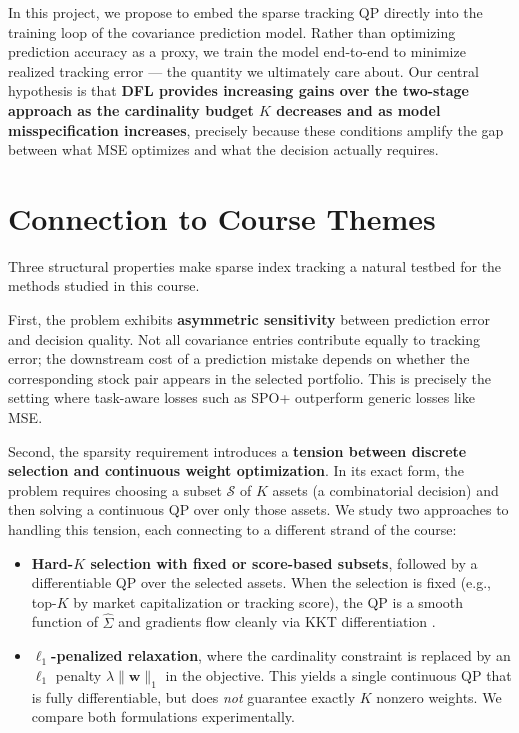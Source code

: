 \documentclass[11pt]{article}
\begin{document}
In this project, we propose to embed the sparse tracking QP directly into the training loop of the covariance prediction model. Rather than optimizing prediction accuracy as a proxy, we train the model end-to-end to minimize realized tracking error --- the quantity we ultimately care about. Our central hypothesis is that \textbf{DFL provides increasing gains over the two-stage approach as the cardinality budget $K$ decreases and as model misspecification increases}, precisely because these conditions amplify the gap between what MSE optimizes and what the decision actually requires.

\section{Connection to Course Themes}

Three structural properties make sparse index tracking a natural testbed for the methods studied in this course.

First, the problem exhibits \textbf{asymmetric sensitivity} between prediction error and decision quality. Not all covariance entries contribute equally to tracking error; the downstream cost of a prediction mistake depends on whether the corresponding stock pair appears in the selected portfolio. This is precisely the setting where task-aware losses such as SPO+ \citep{elmachtoub2022smart} outperform generic losses like MSE.

Second, the sparsity requirement introduces a \textbf{tension between discrete selection and continuous weight optimization}. In its exact form, the problem requires choosing a subset $\mathcal{S}$ of $K$ assets (a combinatorial decision) and then solving a continuous QP over only those assets. We study two approaches to handling this tension, each connecting to a different strand of the course:
\begin{itemize}[nosep]
  \item \textbf{Hard-$K$ selection with fixed or score-based subsets}, followed by a differentiable QP over the selected assets. When the selection is fixed (e.g., top-$K$ by market capitalization or tracking score), the QP is a smooth function of $\hat{\Sigma}$ and gradients flow cleanly via KKT differentiation \citep{agrawal2019differentiable}.
  \item \textbf{$\ell_1$-penalized relaxation}, where the cardinality constraint is replaced by an $\ell_1$ penalty $\lambda \|\mathbf{w}\|_1$ in the objective. This yields a single continuous QP that is fully differentiable, but does \emph{not} guarantee exactly $K$ nonzero weights. We compare both formulations experimentally.
\end{itemize}
\end{document}
